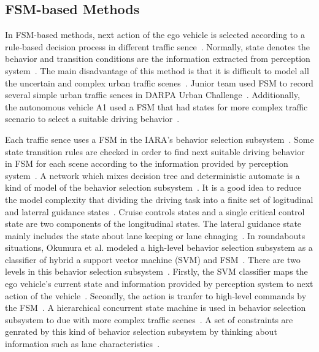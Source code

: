 \documentclass[conference]{IEEEtran}
\begin{document}
\subsection{FSM-based Methods}
In FSM-based methods, next action of the ego vehicle is selected according to a rule-based decision process in different traffic sence~\cite{self_driving}. Normally, state denotes the behavior and transition conditions are the information extracted from perception system~\cite{self_driving}. The main disadvantage of this method is that it is difficult to model all the uncertain and complex urban traffic scenes~\cite{self_driving}. Junior team used FSM to record several simple urban traffic sences in DARPA Urban Challenge~\cite{buehler2009darpa}. Additionally, the autonomous vehicle A1 used a FSM that had states for more complex traffic scenario to select a suitable driving behavior~\cite{jo2015development}.

Each traffic sence uses a FSM in the IARA's behavior selection subsystem~\cite{guidolini2018handling}. Some state transition rules are checked in order to find next suitable driving behavior in FSM for each scene according to the information provided by perception system~\cite{guidolini2018handling}. A network which mixes decision tree and deterministic automate is a kind of model of the behavior selection subsystem~\cite{Aeberhard2015}. It is a good idea to reduce the model complexity that dividing the driving task into a finite set of logitudinal and laterral guidance states~\cite{Aeberhard2015}. Cruise controls states and a single critical control state are two components of the longitudinal states. The lateral guidance state mainly includes the state about lane keeping or lane chnaging~\cite{Aeberhard2015}. In roundabouts situations, Okumura et al. modeled a high-level behavior selection subsystem as a classifier of hybrid a support vector machine (SVM) and FSM~\cite{Okumura2016}. There are two levels in this behavior selection subsystem~\cite{Okumura2016}. Firstly, the SVM classifier maps the ego vehicle's current state and information provided by perception system to next action of the vehicle~\cite{Okumura2016}. Secondly, the action is tranfer to high-level commands by the FSM~\cite{Okumura2016}. A hierarchical concurrent state machine is used in behavior selection subsystem to due with more complex traffic scenes~\cite{Ziegler2014}. A set of constraints are genrated by this kind of behavior selection subsystem by thinking about information such as lane characteristics~\cite{Ziegler2014}. 
\end{document}
